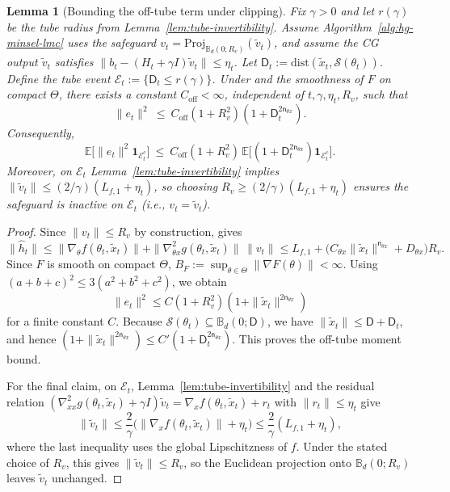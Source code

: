 \documentclass{article}
\theoremstyle{normaltheorem}
\newtheorem{lemma}[lemma]{Lemma}
\newcommand{\calS}{\mathcal{S}}
\begin{document}
\begin{lemma}[Bounding the off-tube term under clipping]\label{lem:off-tube-et}
Fix $\gamma>0$ and let \(r(\gamma)\) be the tube radius from Lemma~\ref{lem:tube-invertibility}.
Assume Algorithm~\ref{alg:hg-minsel-lmc} uses the safeguard $v_t=\mathrm{Proj}_{\mathbb B_d(0;R_v)}(\tilde v_t)$, and assume the CG output $\tilde v_t$ satisfies $\|b_t-(H_t+\gamma I)\tilde v_t\|\le \eta_t$.
Let \(\mathsf{D}_{t}:=\mathrm{dist}(\tilde x_t,\calS(\theta_t))\).
Define the tube event \(\mathcal E_t:=\{\mathsf{D}_{t}\le r(\gamma)\}\).
Under  and the smoothness of \(F\) on compact \(\Theta\), there exists a constant \(C_{\mathrm{off}}<\infty\), independent of \(t,\gamma,\eta_t,R_v\), such that
\[
\|e_t\|^2
\ \le\
C_{\mathrm{off}}(1+R_v^2)(1+\mathsf{D}_{t}^{2\mathsf n_{\theta x}}).
\]
Consequently,
\[
\mathbb E\big[\|e_t\|^2\mathbf 1_{\mathcal E_t^c}\big]
\ \le\
C_{\mathrm{off}}(1+R_v^2)\,
\mathbb E\big[(1+\mathsf{D}_{t}^{2\mathsf n_{\theta x}})\mathbf 1_{\mathcal E_t^c}\big].
\]
Moreover, on $\mathcal E_t$ Lemma~\ref{lem:tube-invertibility} implies $\|\tilde v_t\|\le (2/\gamma)(L_{f,1}+\eta_t)$, so choosing
$R_v\ge (2/\gamma)(L_{f,1}+\eta_t)$ ensures the safeguard is inactive on $\mathcal E_t$ (i.e., $v_t=\tilde v_t$).
\end{lemma}
\begin{proof}
Since $\|v_t\|\le R_v$ by construction,  gives
\[
\|\widehat h_t\|
\le \|\nabla_\theta f(\theta_t,\tilde x_t)\|+\|\nabla^2_{\theta x}g(\theta_t,\tilde x_t)\|\,\|v_t\|
\le L_{f,1}+\big(C_{\theta x}\|\tilde x_t\|^{\mathsf n_{\theta x}}+D_{\theta x}\big)R_v.
\]
Since $F$ is smooth on compact \(\Theta\), \(B_F:=\sup_{\theta\in\Theta}\|\nabla F(\theta)\|<\infty\).
Using \((a+b+c)^2\le 3(a^2+b^2+c^2)\), we obtain
\[
\|e_t\|^2\le C(1+R_v^2)(1+\|\tilde x_t\|^{2\mathsf n_{\theta x}})
\]
for a finite constant \(C\).
Because \(\calS(\theta_t)\subseteq\mathbb B_d(0;\mathsf D)\), we have \(\|\tilde x_t\|\le \mathsf D+\mathsf{D}_{t}\), and hence
\((1+\|\tilde x_t\|^{2\mathsf n_{\theta x}})\le C'(1+\mathsf{D}_{t}^{2\mathsf n_{\theta x}})\).
This proves the off-tube moment bound.

For the final claim, on \(\mathcal E_t\), Lemma~\ref{lem:tube-invertibility} and the residual relation
$(\nabla^2_{xx}g(\theta_t,\tilde x_t)+\gamma I)\tilde v_t=\nabla_x f(\theta_t,\tilde x_t)+r_t$ with $\|r_t\|\le\eta_t$ give
\[
\|\tilde v_t\|
\le \frac{2}{\gamma}\big(\|\nabla_x f(\theta_t,\tilde x_t)\|+\eta_t\big)
\le \frac{2}{\gamma}(L_{f,1}+\eta_t),
\]
where the last inequality uses the global Lipschitzness of \(f\).
Under the stated choice of \(R_v\), this gives \(\|\tilde v_t\|\le R_v\), so the Euclidean projection onto \(\mathbb B_d(0;R_v)\) leaves \(\tilde v_t\) unchanged.
\end{proof}
\end{document}
